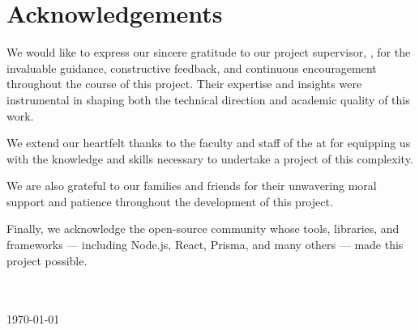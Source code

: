 \chapter*{Acknowledgements}

We would like to express our sincere gratitude to our project supervisor, \textbf{\supervisor}, for the invaluable guidance, constructive feedback, and continuous encouragement throughout the course of this project. Their expertise and insights were instrumental in shaping both the technical direction and academic quality of this work.

We extend our heartfelt thanks to the faculty and staff of the \textbf{\department} at \textbf{\university} for equipping us with the knowledge and skills necessary to undertake a project of this complexity.

We are also grateful to our families and friends for their unwavering moral support and patience throughout the development of this project.

Finally, we acknowledge the open-source community whose tools, libraries, and frameworks --- including Node.js, React, Prisma, and many others --- made this project possible.

\vspace{2cm}

\noindent \authorA \\
\noindent \authorB \\[0.3cm]
\noindent \today

\clearpage
